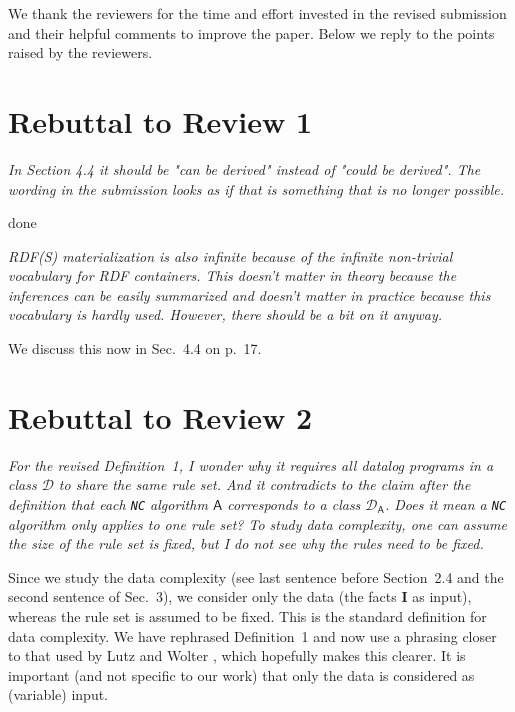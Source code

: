 \documentclass{article}
\let\quoteOld\quote
\let\endquoteOld\endquote
\renewenvironment{quote}{\quoteOld\itshape}{\endquoteOld}
\begin{document}
We thank the reviewers for the time and effort invested in the revised
submission and their helpful comments to improve the paper. Below we
reply to the points raised by the reviewers.


\section{Rebuttal to Review 1}

\begin{quote}
In Section 4.4 it should be "can be derived" instead of "could be derived".
The wording in the submission looks as if that is something that is no
longer possible.
\end{quote}

done

\begin{quote}
RDF(S) materialization is also infinite because of the infinite non-trivial
vocabulary for RDF containers.  This doesn't matter in theory because the
inferences can be easily summarized and doesn't matter in practice because
this vocabulary is hardly used.  However, there should be a bit on it
anyway.
\end{quote}

We discuss this now in Sec.~4.4 on p.~17.


\section{Rebuttal to Review 2}

\begin{quote}
  For the revised Definition~1, I wonder why it requires all datalog
  programs in a class $\mathcal{D}$ to share the same rule set. And it
  contradicts to the claim after the definition that each \texttt{NC}
  algorithm $\mathsf{A}$ corresponds to a class
  $\mathcal{D}_\mathsf{A}$. Does it mean a \texttt{NC} algorithm only
  applies to one rule set? To study data complexity, one can assume
  the size of the rule set is fixed, but I do not see why the rules
  need to be fixed.
\end{quote}

Since we study the data complexity (see last sentence before
Section~2.4 and the second sentence of Sec.~3), we consider only the
data (the facts $\textbf{I}$ as input), whereas the rule set is
assumed to be fixed. This is the standard definition for data
complexity. We have rephrased Definition~1 and now use a phrasing
closer to that used by Lutz and Wolter \cite{LuWo17a}, which hopefully
makes this clearer. It is important (and not specific to our work)
that only the data is considered as (variable) input. 
\end{document}
